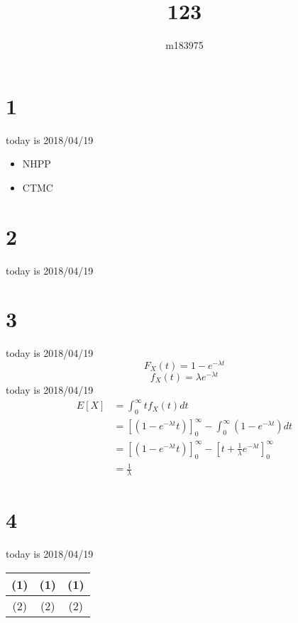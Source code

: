 \documentclass{article}
\title{123}
\author{m183975}
\begin{document}
\maketitle
\section{1}
today is 2018/04/19

\begin{itemize}
  \item NHPP
  \item CTMC
\end{itemize}
\section{2}
today is 2018/04/19 
\section{3}
today is 2018/04/19
\begin{equation}
  F_{X}(t) = 1-e^{-{\lambda}t}
\end{equation}
\begin{equation}
  f_{X}(t) = {\lambda}e^{-{\lambda}t}
\end{equation}
today is 2018/04/19
\begin{equation}
\begin{aligned}
E[X]&=\int_{0}^{\infty}tf_{X}(t)dt\\
&=[(1-e^{-{\lambda}t}t)]^\infty_{0}-\int_{0}^{\infty}(1-e^{-{\lambda}t})dt\\
&=[(1-e^{-{\lambda}t}t)]^\infty_{0}-[t+\frac{1}{\lambda}e^{-{\lambda}t}]^\infty_{0}\\
&=\frac{1}{\lambda}
\end{aligned}
\end{equation}
\section{4}
today is 2018/04/19\\
\begin{table}[!hbt]  
  \centering  
\begin{tabular}{|c|c|c|}%
\hline  
(1)&(1)&(1)\\
\hline  
(2)&(2)&(2)\\
\hline 
\end{tabular}
\end{table} 
\end{document}
